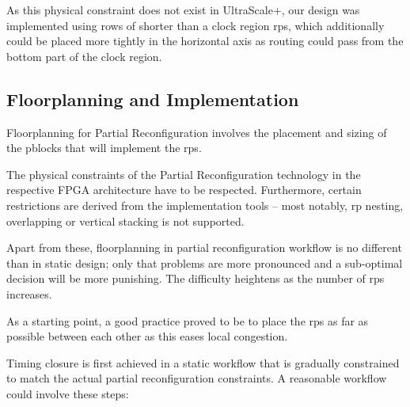 As this physical constraint does not exist in UltraScale+,
our design was implemented using rows of shorter than a clock region \glspl{rp},
which additionally could be placed more tightly in the horizontal axis 
as routing could pass from the bottom part of the clock region.



\subsection{Floorplanning and Implementation}

Floorplanning for Partial Reconfiguration involves the placement and sizing of the \glspl{pblock}
that will implement the \glspl{rp}. 

The physical constraints of the Partial Reconfiguration technology 
in the respective FPGA architecture have to be respected. 
Furthermore, certain restrictions are derived from the implementation tools
-- most notably, \gls{rp} nesting, overlapping or vertical stacking is not supported.

Apart from these, floorplanning in partial reconfiguration workflow is no different
than in static design; only that problems are more pronounced and
a sub-optimal decision will be more punishing. The difficulty heightens as
the number of \glspl{rp} increases.

As a starting point, a good practice proved to be to place the \glspl{rp}
as far as possible between each other as this eases local congestion.

Timing closure is first achieved in a static workflow that is gradually constrained
to match the actual partial reconfiguration constraints. 
A reasonable workflow could involve these steps:

